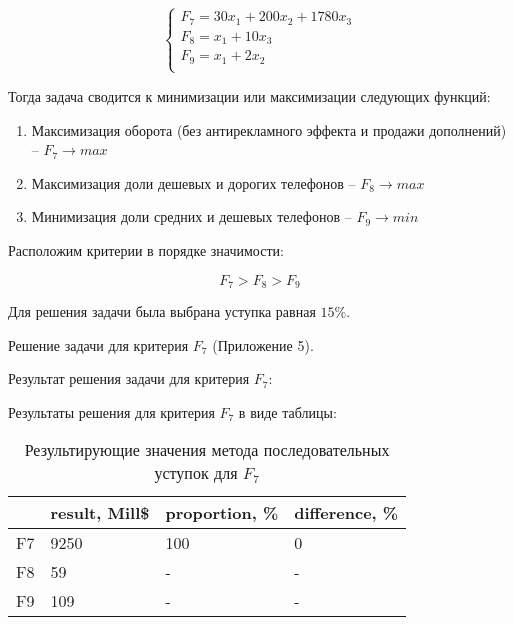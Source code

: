 \begin{equation*}
\begin{cases}
\text{$F_7=30x_1+200x_2+1780x_3$} \\
\text{$F_8=x_1+10x_3$} \\
\text{$F_9=x_1+2x_2$} \\
\end{cases}
\end{equation*}

Тогда задача сводится к минимизации или максимизации следующих функций:

\begin{enumerate}
	\item Максимизация оборота (без антирекламного эффекта и продажи дополнений) -- $F_7\rightarrow max$
	\item Максимизация доли дешевых и дорогих телефонов -- $F_8\rightarrow max$
	\item Минимизация доли средних и дешевых телефонов -- $F_9\rightarrow min$
\end{enumerate}

Расположим критерии в порядке значимости:

\begin{equation*}
\text{$F_7>F_8>F_9$}
\end{equation*}

Для решения задачи была выбрана уступка равная $15\%$.

Решение задачи для критерия $F_7$ (Приложение 5).

Результат решения задачи для критерия $F_7$:



Результаты решения для критерия $F_7$ в виде таблицы:

\begin{table}[h!]
	\centering
	\bgroup
	\captionsetup{singlelinecheck = false, format= hang, justification=raggedleft, font=footnotesize, labelsep=space}
	\caption{Результирующие значения метода последовательных уступок для $F_7$}
	\def\arraystretch{1}
	\begin{tabular}{ | m{1.2cm} | m{1.9cm} | m{2.2cm} | m{2.2cm} | }
		\hline
		& result, Mill\$ & proportion, \% & difference, \% \\ \hline
		F7 & 9250 & 100 & 0 \\ \hline
		F8 & 59 & - & - \\ \hline
		F9 & 109 & - & - \\
		\hline
	\end{tabular}
	\egroup
\end{table}

